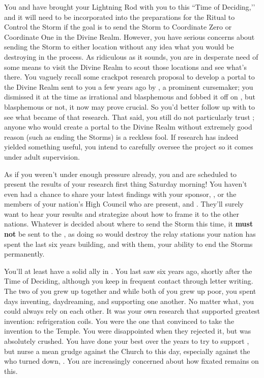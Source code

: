\documentclass[char]{GL2020}
\begin{document}
You and \cAssistantScientist{} have brought your Lightning Rod with you to this ``Time of Deciding,’’ and it will need to be incorporated into the preparations for the Ritual to Control the Storm if the goal is to send the Storm to Coordinate Zero or Coordinate One in the Divine Realm. However, you have serious concerns about sending the Storm to either location without any idea what you would be destroying in the process. As ridiculous as it sounds, you are in desperate need of some means to visit the Divine Realm to scout those locations and see what's there. You vaguely recall some crackpot research proposal to develop a portal to the Divine Realm sent to you a few years ago by \cCurse{\full}, a prominent cursemaker; you dismissed it at the time as irrational and blasphemous and fobbed it off on \cAssistantScientist{}, but blasphemous or not, it now may prove crucial. So you’d better follow up with \cAssistantScientist{\them} to see what became of that research. That said, you still do not particularly trust \cCurse{}; anyone who would create a portal to the Divine Realm without extremely good reason (such as ending the Storms) is a reckless fool. If \cCurse{\their} research has indeed yielded something useful, you intend to carefully oversee the project so it comes under adult supervision.

As if you weren't under enough pressure already, you and \cAssistantScientist{} are scheduled to present the results of your research first thing Saturday morning! You haven't even had a chance to share your latest findings with your sponsor, \cDiplomat{\full}, or the members of your nation's High Council who are present, \cAntiChup{\full} and \cTechStar{\full}. They’ll surely want to hear your results and strategize about how to frame it to the other nations. Whatever is decided about where to send the Storm this time, it \textbf{must not} be sent to the \pTech{}, as doing so would destroy the relay stations your nation has spent the last six years building, and with them, your ability to end the Storms permanently.

You'll at least have a solid ally in \cChupInventor{\full}. You last saw \cChupInventor{\them} six years ago, shortly after the Time of Deciding, although you keep in frequent contact through letter writing. The two of you grew up together and while both of you grew up poor, you spent days inventing, daydreaming, and supporting one another. No matter what, you could always rely on each other. It was your own research that supported \cChupInventor{\their} greatest invention: refrigeration coils. You were the one that convinced \cChupInventor{} to take the invention to the Temple. You were disappointed when they rejected it, but \cChupInventor{} was absolutely crushed. You have done your best over the years to try to support \cChupInventor{}, but \cChupInventor{\they} nurse\cChupInventor{\verbs} a mean grudge against the Church to this day, especially against the \cAntiChup{\cleric} who turned \cChupInventor{\them} down, \cAntiChup{\full}. You are increasingly concerned about how fixated \cChupInventor{} remains on this.
\end{document}
